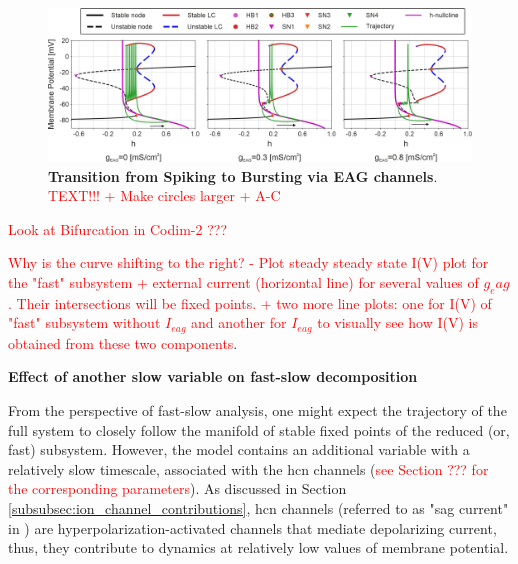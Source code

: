\documentclass[../main.tex]{subfiles}
\begin{document}
\begin{figure}[!t]
    \centering
    \includegraphics[width=\linewidth]{../img/spiking_to_bursting/bifurcation_wang.png}
    \caption[Transition from Spiking to Bursting via EAG channels]{
        \textbf{Transition from Spiking to Bursting via EAG channels}. \textcolor{red}{TEXT!!! + Make circles larger + A-C}
    }
    \label{fig:spiking_to_bursting_wang_bifurcation}
\end{figure}

\textcolor{red}{Look at Bifurcation in Codim-2 ???}

\textcolor{red}{Why is the curve shifting to the right? - Plot steady steady state I(V) plot for the "fast" subsystem + external current (horizontal line) for several values of $g_eag$. Their intersections will be fixed points. + two more line plots: one for I(V) of "fast" subsystem without $I_{eag}$ and another for $I_{eag}$ to visually see how I(V) is obtained from these two components}.

\vspace*{0.3cm}
\noindent\textbf{Effect of another slow variable on fast-slow decomposition}

From the perspective of fast-slow analysis, one might expect the trajectory of the full system to closely follow the manifold of stable fixed points of the reduced (or, fast) subsystem. However, the model contains an additional variable with a relatively slow timescale, associated with the \gls{hcn} channels (\textcolor{red}{see Section ??? for the corresponding parameters}). As discussed in Section \ref{subsubsec:ion_channel_contributions}, \gls{hcn} channels (referred to as "sag current" in \parencite{wangMultipleDynamicalModes1994}) are hyperpolarization-activated channels that mediate depolarizing current, thus, they contribute to dynamics at relatively low values of membrane potential.
\end{document}
